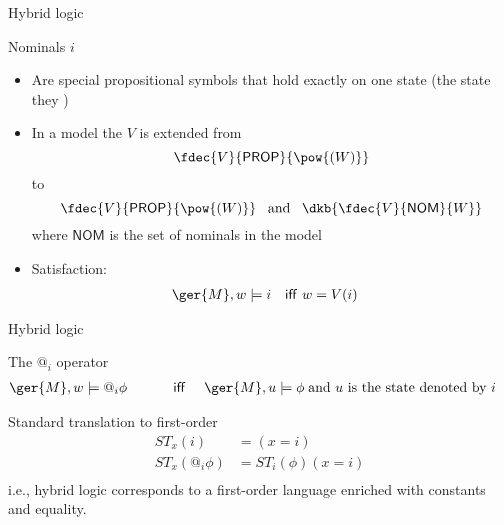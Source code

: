 \documentclass{beamer}
\begin{document}
\begin{slide}{Hybrid logic}\label{s:47}
\small

\begin{block}{Nominals $i$}
\begin{itemize}
\item Are special propositional symbols that hold exactly on one state (the state they )
\item  In a model the  $V$ is extended from 
$$ \fdec{V}{\mathsf{PROP}}{\pow{(W)}} $$
to
$$ \fdec{V}{\mathsf{PROP}}{\pow{(W)}} \; \; \; \text{and}\; \; \;  \dkb{\fdec{V}{\mathsf{NOM}}{W} }$$
where $\mathsf{NOM}$ is the set of nominals in the model
\item Satisfaction:
\begin{align*}
\ger{M}, w & \models  i &  \text{\textsf{iff} }  & w = V(i)
\end{align*}
\end{itemize}
\end{block}


\end{slide}



\begin{slide}{Hybrid logic}\label{s:48}
\small

\begin{block}{The $@_i$ operator}
\begin{align*}
\ger{M}, w & \models  @_i \phi &  \text{~~~~~~ \textsf{iff} ~~~}  &\ger{M}, u  \models \phi\; \text{and $u$ is the state denoted by $i$}
\end{align*}
\end{block}

\begin{block}{Standard translation to first-order}
\begin{align*}
ST_x(i) & =  (x = i)\\
ST_x(@_i \phi) & =  ST_i(\phi)(x = i)\\
\end{align*}
i.e., hybrid logic corresponds to a first-order language enriched with constants and equality.
\end{block}
\end{slide}
\end{document}

